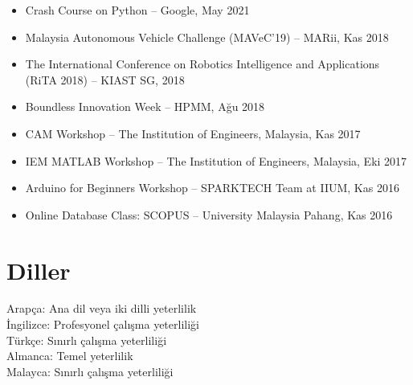 \documentclass[11pt,a4paper]{article}
\begin{document}
\begin{itemize}
    \item Crash Course on Python -- Google, May 2021
    \item Malaysia Autonomous Vehicle Challenge (MAVeC'19) -- MARii, Kas 2018
    \item The International Conference on Robotics Intelligence and Applications (RiTA 2018) -- KIAST SG, 2018
    \item Boundless Innovation Week -- HPMM, Ağu 2018
    \item CAM Workshop -- The Institution of Engineers, Malaysia, Kas 2017
    \item IEM MATLAB Workshop -- The Institution of Engineers, Malaysia, Eki 2017
    \item Arduino for Beginners Workshop -- SPARKTECH Team at IIUM, Kas 2016
    \item Online Database Class: SCOPUS -- University Malaysia Pahang, Kas 2016
\end{itemize}

\section*{Diller}

Arapça: Ana dil veya iki dilli yeterlilik\\
İngilizce: Profesyonel çalışma yeterliliği\\
Türkçe: Sınırlı çalışma yeterliliği\\
Almanca: Temel yeterlilik\\
Malayca: Sınırlı çalışma yeterliliği
\end{document}
